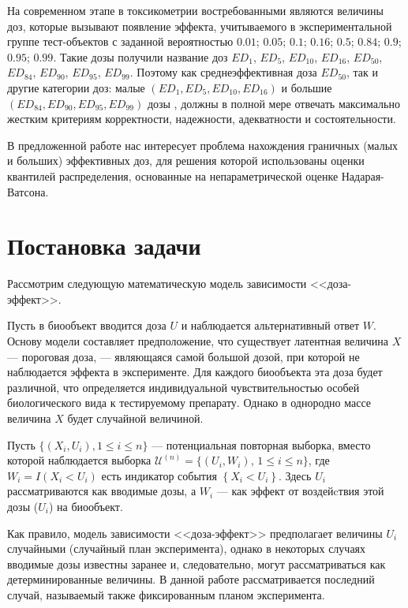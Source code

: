 \documentclass[a4paper,14pt,russian]{article}
\begin{document}
На современном этапе в токсикометрии востребованными являются величины доз, которые вызывают появление эффекта, учитываемого в экспериментальной группе тест-объектов с заданной вероятностью $0.01$; $0.05$; $0.1$; $0.16$;
$0.5$; $0.84$; $0.9$; $0.95$; $0.99$. Такие дозы получили название доз $ED_1$, $ED_5$, $ED_{10}$, $ED_{16}$,  $ED_{50}$, $ED_{84}$, $ED_{90}$,  $ED_{95}$, $ED_{99}$. Поэтому как среднеэффективная доза $ED_{50}$, так и другие категории доз: малые  $(ED_1, ED_5, ED_{10}, ED_{16})$ и большие $(ED_{84}, ED_{90},  ED_{95}, ED_{99})$ дозы , должны в полной мере отвечать максимально жестким критериям корректности, надежности, адекватности и состоятельности.

В предложенной работе нас интересует проблема нахождения граничных (малых и больших) эффективных доз, для решения которой использованы оценки квантилей распределения, основанные на непараметрической оценке Надарая-Ватсона.

\newpage

\section{Постановка задачи}

Рассмотрим следующую математическую модель зависимости <<доза-\linebreak эффект>>.

Пусть в биообъект вводится доза $U$ и наблюдается альтернативный ответ $W$. Основу модели составляет предположение, что существует латентная величина $X$ --- пороговая доза, --- являющаяся самой большой дозой, при которой не наблюдается эффекта в эксперименте. Для каждого биообъекта эта доза будет различной, что определяется индивидуальной чувствительностью особей биологического вида к тестируемому препарату. Однако в однородно массе величина $X$ будет случайной величиной.

Пусть $\{ ( X_i, U_i ), 1\leq i\leq n \}$ --- потенциальная повторная выборка, вместо которой наблюдается выборка ${\mathcal U}^{(n)}=\{ (U_i, W_i)$, $1\leq i\leq n \}$, где $W_i=I(X_i<U_i)$ есть индикатор события $\left\{X_i<U_i\right\}$. Здесь  $U_i$ рассматриваются как вводимые дозы, а $W_i$ --- как  эффект от воздейcтвия этой дозы ($U_i$) на биообъект.

Как правило, модель зависимости <<доза-эффект>> предполагает величины $U_i$ случайными (случайный план эксперимента), однако в некоторых случаях вводимые дозы известны заранее и, следовательно, могут рассматриваться как детерминированные величины. В данной работе рассматривается последний случай, называемый также фиксированным планом эксперимента.
\end{document}
